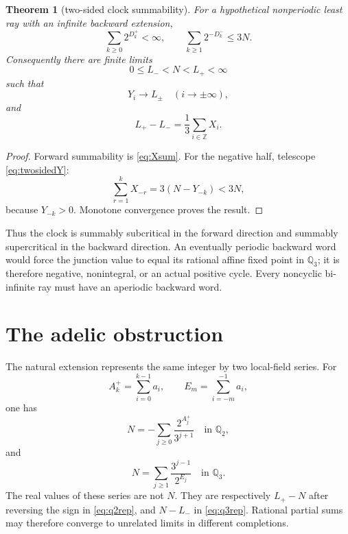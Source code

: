 \documentclass[11pt,reqno]{amsart}
\theoremstyle{plain}
\newtheorem{theorem}{Theorem}[section]
\theoremstyle{definition}
\numberwithin{equation}{section}
\newcommand{\Z}{\mathbb{Z}}
\newcommand{\Qp}[1]{\mathbb{Q}_{#1}}
\begin{document}
\begin{theorem}[two-sided clock summability]
\label{thm:twosided}
For a hypothetical nonperiodic least ray with an infinite backward extension,
\begin{equation}\label{eq:twosum}
\sum_{k\ge0}2^{D_k^+}<\infty,
\qquad
\sum_{k\ge1}2^{-D_k^-}\le3N.
\end{equation}
Consequently there are finite limits
\[
0\le L_-<N<L_+<\infty
\]
such that
\[
Y_i\longrightarrow L_\pm
\quad(i\to\pm\infty),
\]
and
\begin{equation}\label{eq:Ldiff}
L_+-L_-=\frac13\sum_{i\in\Z}X_i.
\end{equation}
\end{theorem}

\begin{proof}
Forward summability is \eqref{eq:Xsum}.  For the negative half, telescope
\eqref{eq:twosidedY}:
\[
\sum_{r=1}^kX_{-r}=3(N-Y_{-k})<3N,
\]
because $Y_{-k}>0$.  Monotone convergence proves the result.
\end{proof}

Thus the clock is summably subcritical in the forward direction and summably
supercritical in the backward direction.  An eventually periodic backward
word would force the junction value to equal its rational affine fixed point
in $\Qp{3}$; it is therefore negative, nonintegral, or an actual positive
cycle.  Every noncyclic bi-infinite ray must have an aperiodic backward word.

\section{The adelic obstruction}
\label{sec:adelic}

The natural extension represents the same integer by two local-field series.
For
\[
A_k^+=\sum_{i=0}^{k-1}a_i,
\qquad
E_m=\sum_{i=-m}^{-1}a_i,
\]
one has
\begin{equation}\label{eq:q2rep}
N=-\sum_{j\ge0}\frac{2^{A_j^+}}{3^{j+1}}
\quad\text{in }\Qp{2},
\end{equation}
and
\begin{equation}\label{eq:q3rep}
N=\sum_{j\ge1}\frac{3^{j-1}}{2^{E_j}}
\quad\text{in }\Qp{3}.
\end{equation}
The real values of these series are not $N$.  They are respectively
$L_+-N$ after reversing the sign in \eqref{eq:q2rep}, and $N-L_-$ in
\eqref{eq:q3rep}.  Rational partial sums may therefore converge to unrelated
limits in different completions.
\end{document}
